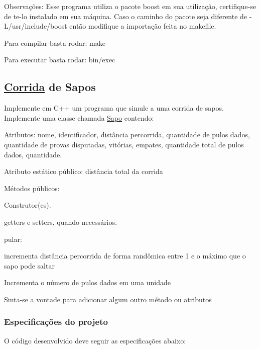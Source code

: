 Observações\+: Esse programa utiliza o pacote boost em sua utilização, certifique-\/se de te-\/lo instalado em sua máquina. Caso o caminho do pacote seja diferente de {\ttfamily -\/\+L/usr/include/boost} então modifique a importação feita no makefile.

Para compilar basta rodar\+: {\ttfamily make}

Para executar basta rodar\+: {\ttfamily bin/exec}

\subsection*{\hyperlink{classCorrida}{Corrida} de Sapos}

Implemente em C++ um programa que simule a uma corrida de sapos. Implemente uma classe chamada \hyperlink{classSapo}{Sapo} contendo\+:


\begin{DoxyItemize}
\item Atributos\+: nome, identificador, distância percorrida, quantidade de pulos dados, quantidade de provas disputadas, vitórias, empates, quantidade total de pulos dados, quantidade.
\item Atributo estático público\+: distância total da corrida
\item Métodos públicos\+:
\begin{DoxyItemize}
\item Construtor(es).
\item getters e setters, quando necessários.
\item pular\+:
\begin{DoxyItemize}
\item incrementa distância percorrida de forma randômica entre 1 e o máximo que o sapo pode saltar
\item Incrementa o número de pulos dados em uma unidade
\end{DoxyItemize}
\end{DoxyItemize}
\item Sinta-\/se a vontade para adicionar algum outro método ou atributos
\end{DoxyItemize}

\subsubsection*{Especificações do projeto}

O código desenvolvido deve seguir as especificações abaixo\+:


